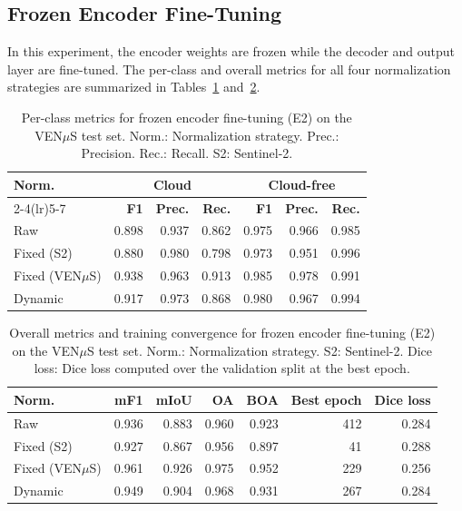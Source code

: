 \subsection{Frozen Encoder Fine-Tuning}
\label{sec:e2_results}

In this experiment, the encoder weights are frozen while the decoder and output layer are fine-tuned. The per-class and overall metrics for all four normalization strategies are summarized in Tables~\ref{tab:e2_perclass} and~\ref{tab:e2_overall}.

\begin{table}[H]
\centering
\caption[Per-class metrics for frozen encoder fine-tuning on the VEN$\mu$S test set.]{Per-class metrics for frozen encoder fine-tuning (E2) on the VEN$\mu$S test set. Norm.: Normalization strategy. Prec.: Precision. Rec.: Recall. S2: Sentinel-2.}
\label{tab:e2_perclass}
\small
\begin{tabular}{lrrrrrr}
\toprule
\multirow{2}{*}{\textbf{Norm.}} & 
\multicolumn{3}{c}{\textbf{Cloud}} & 
\multicolumn{3}{c}{\textbf{Cloud-free}} \\
\cmidrule(lr){2-4}\cmidrule(lr){5-7}
& \textbf{F1} & \textbf{Prec.} & \textbf{Rec.} & 
\textbf{F1} & \textbf{Prec.} & \textbf{Rec.} \\
\midrule
Raw               & 0.898 & 0.937 & 0.862 & 0.975 & 0.966 & 0.985 \\
Fixed (S2)        & 0.880 & 0.980 & 0.798 & 0.973 & 0.951 & 0.996 \\
Fixed (VEN$\mu$S) & 0.938 & 0.963 & 0.913 & 0.985 & 0.978 & 0.991 \\
Dynamic           & 0.917 & 0.973 & 0.868 & 0.980 & 0.967 & 0.994 \\
\bottomrule
\end{tabular}
\end{table}

\begin{table}[H]
\centering
\caption[Overall metrics and training convergence for frozen encoder fine-tuning.]{Overall metrics and training convergence for frozen encoder fine-tuning (E2) on the VEN$\mu$S test set. Norm.: Normalization strategy. S2: Sentinel-2. Dice loss: Dice loss computed over the validation split at the best epoch.}
\label{tab:e2_overall}
\small
\begin{tabular}{lrrrrrr}
\toprule
\textbf{Norm.} & \textbf{mF1} & \textbf{mIoU} & 
\textbf{OA} & \textbf{BOA} & 
\textbf{Best epoch} & \textbf{Dice loss} \\
\midrule
Raw               & 0.936 & 0.883 & 0.960 & 0.923 & 412 & 0.284 \\
Fixed (S2)        & 0.927 & 0.867 & 0.956 & 0.897 & 41  & 0.288 \\
Fixed (VEN$\mu$S) & 0.961 & 0.926 & 0.975 & 0.952 & 229 & 0.256 \\
Dynamic           & 0.949 & 0.904 & 0.968 & 0.931 & 267 & 0.284 \\
\bottomrule
\end{tabular}
\end{table}

